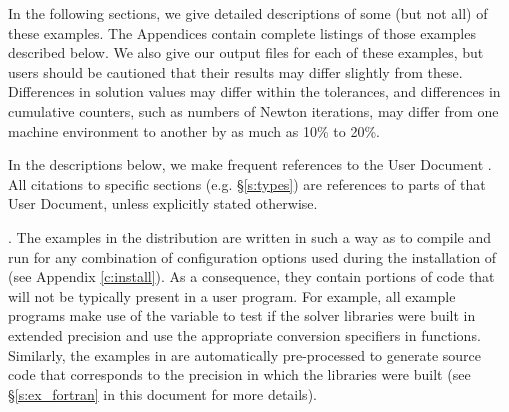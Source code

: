 \vspace{0.2in}\noindent 
In the following sections, we give detailed descriptions of some (but
not all) of these examples.  The Appendices contain complete listings
of those examples described below.  We also give our output files for
each of these examples, but users should be cautioned that their
results may differ slightly from these.  Differences in solution
values may differ within the tolerances, and differences in cumulative
counters, such as numbers of Newton iterations, may differ
from one machine environment to another by as much as 10\% to 20\%.

In the descriptions below, we make frequent references to the {\kinsol}
User Document \cite{kinsol_ug}.  All citations to specific sections
(e.g. \S\ref{s:types}) are references to parts of that User Document, unless
explicitly stated otherwise.

\vspace{0.2in}. 
The examples in the {\kinsol} distribution are written in such a way as
to compile and run for any combination of configuration options used during
the installation of {\sundials} (see Appendix \ref{c:install}). As a consequence,
they contain portions of code that will not be typically present in a
user program. For example, all {\C} example programs make use of the
variable  to test if the solver libraries
were built in extended precision and use the appropriate conversion 
specifiers in  functions. Similarly, the {\F} examples in
{\fkinsol} are automatically pre-processed to generate source code that
corresponds to the precision in which the {\kinsol} libraries were built
(see \S\ref{s:ex_fortran} in this document for more details).

